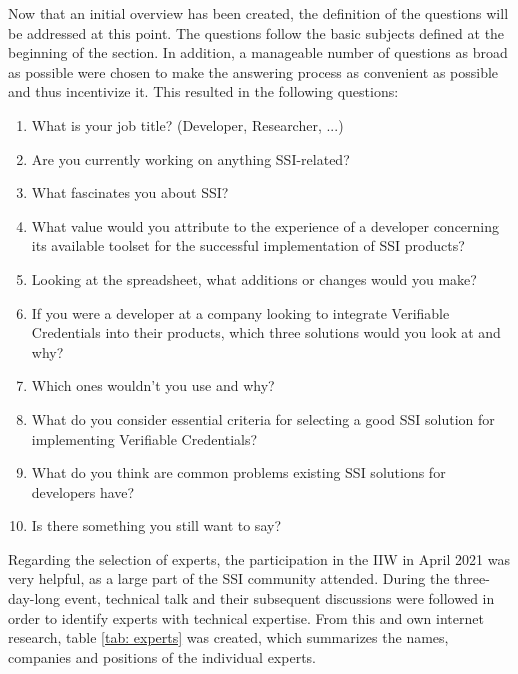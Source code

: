     Now that an initial overview has been created, the definition of the questions will be addressed at this point. The questions follow the basic subjects defined at the beginning of the section. In addition, a manageable number of questions as broad as possible were chosen to make the answering process as convenient as possible and thus incentivize it. This resulted in the following questions:
    
    \begin{enumerate}
        \item What is your job title? (Developer, Researcher, ...)		
        \item Are you currently working on  anything SSI-related?		
        \item What fascinates you about SSI?		
        \item What value would you attribute to the experience of a developer concerning its available toolset for the successful implementation of SSI products?		
        \item Looking at the spreadsheet, what additions or changes would you make?		
        \item If you were a developer at a company looking to integrate Verifiable Credentials into their products, which three solutions would you look at and why?		
        \item Which ones wouldn't you use and why?		
        \item What do you consider essential criteria for selecting a good SSI solution for implementing Verifiable Credentials?		
        \item What do you think are common problems existing SSI solutions for developers have? 
        \item Is there something you still want to say?
    \end{enumerate}
    
    Regarding the selection of experts, the participation in the \ac{IIW} in April 2021 was very helpful, as a large part of the SSI community attended. During the three-day-long event, technical talk \cite{horwitch_proceedings_2021} and their subsequent discussions were followed in order to identify experts with technical expertise. From this and own internet research, table \ref{tab: experts} was created, which summarizes the names, companies and positions of the individual experts.

